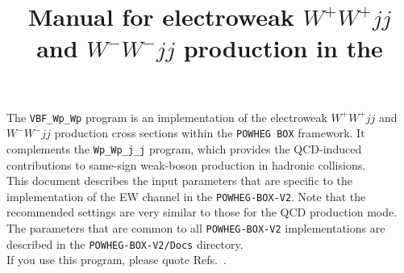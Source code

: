 \documentclass[a4paper,11pt]{article}
\title{Manual for electroweak $W^+W^+ jj$ and $W^-W^- jj$ production in the \POWHEGBOXV{}}
\date{}
\newcommand\POWHEGBOXV{{\tt POWHEG-BOX-V2}}
\def\pbox{{\tt POWHEG BOX}}
\begin{document}
\maketitle
%
\noindent
The {\tt VBF\_Wp\_Wp} program is an implementation of the electroweak
$W^+W^+ jj$ and $W^-W^- jj$ production cross sections within the \pbox{} framework. It
complements the {\tt Wp\_Wp\_j\_j} program, which provides the
QCD-induced contributions to same-sign weak-boson production in hadronic
collisions.
\\[2ex]
This document describes the input parameters that are specific to the
implementation of the EW channel in the \POWHEGBOXV. Note that the recommended settings
are very similar to those for the QCD production mode.  The parameters
that are common to all \POWHEGBOXV{} implementations are described in the {\tt POWHEG-BOX-V2/Docs}
directory.
\\[2ex]
If you use this program, please quote
Refs.~\cite{Jager:2009xx,JZ,Alioli:2010xd}.
\end{document}
